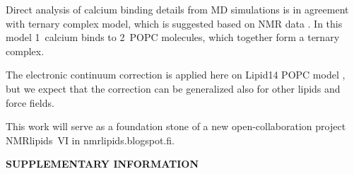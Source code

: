 \documentclass[aip,jcp,twocolumn]{revtex4}
\begin{document}
Direct analysis of calcium binding details from MD simulations is in agreement
with ternary complex model, which is suggested based on NMR data \cite{altenbach84}.
In this model 1~calcium binds to 2~POPC molecules, which together form a ternary
complex.

The electronic continuum correction is applied here on Lipid14 POPC model \cite{dickson14},
but we expect that the correction can be generalized also for other lipids
and force fields.


This work will serve as a foundation stone of a 
new open-collaboration project NMRlipids~VI in nmrlipids.blogspot.fi. 



\begin{acknowledgments}
\end{acknowledgments}
\newpage
\appendix
\begin{center}
{\bf SUPPLEMENTARY INFORMATION}
\end{center}





\listoftodos
\end{document}
